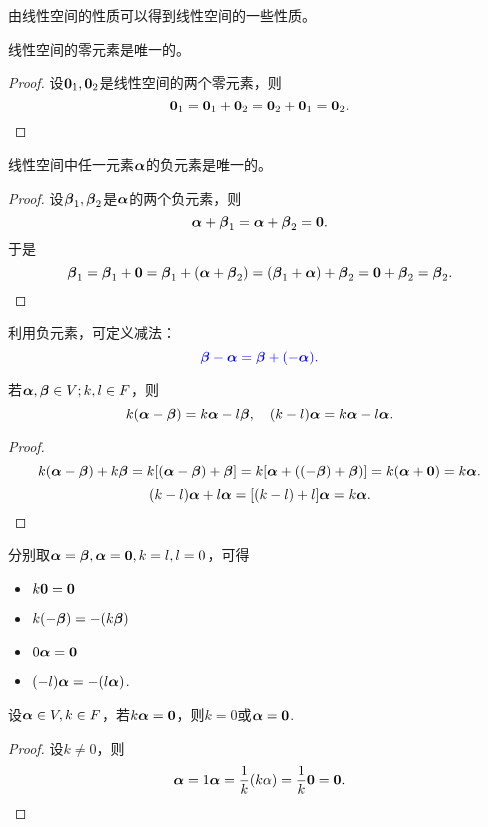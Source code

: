 \begin{frame}
由线性空间的性质可以得到线性空间的一些性质。\pause 

\begin{xingzhi}
  线性空间的零元素是唯一的。
\end{xingzhi} \pause 
\begin{proof}
  设$\M0_1, \M0_2$是线性空间的两个零元素，则
  $$
  \M0_1 = \M0_1+\M0_2 = \M0_2+\M0_1 = \M0_2.
  $$
\end{proof}
\end{frame}

\begin{frame}
\begin{xingzhi}
  线性空间中任一元素$\boldsymbol{\alpha}$的负元素是唯一的。
\end{xingzhi} \pause 
\begin{proof}
  设$\boldsymbol{\beta}_1, \boldsymbol{\beta}_2$是$\boldsymbol{\alpha}$的两个负元素，则
  $$
  \alphabd + \betabd_1 = \alphabd + \betabd_2 = \M0.
  $$
  于是
  $$
  \betabd_1 = \betabd_1 + \M0 = \betabd_1 + (\alphabd + \betabd_2)
  = (\betabd_1 + \alphabd) + \betabd_2 = \M0 + \betabd_2 = \betabd_2.
  $$
\end{proof} \pause 

利用负元素，可定义减法：
$$
\textcolor{blue}{\boldsymbol{\beta} - \boldsymbol{\alpha} = \boldsymbol{\beta} + (-\boldsymbol{\alpha}).}
$$
\end{frame}

\begin{frame}
  \begin{xingzhi}
    若$\boldsymbol{\alpha}, \boldsymbol{\beta} \in V; k, l \in F$，则
    $$
    k(\boldsymbol{\alpha} - \boldsymbol{\beta}) = k \boldsymbol{\alpha} - l \boldsymbol{\beta}, \quad
    (k-l)\boldsymbol{\alpha} = k\boldsymbol{\alpha} - l \boldsymbol{\alpha}.
    $$
  \end{xingzhi}\pause 
  \begin{proof}
    $$
    k(\alphabd - \betabd) + k \betabd = k[(\alphabd - \betabd) + \betabd]
    = k[\alphabd + ((- \betabd) + \betabd)] = k(\alphabd + \M0) = k \alphabd.
    $$
    $$
    (k-l)\boldsymbol{\alpha} + l\boldsymbol{\alpha} = [(k-l)+l]\boldsymbol{\alpha} = k\boldsymbol{\alpha}.
    $$
  \end{proof}\pause 

  分别取$\alphabd=\betabd, \alphabd = \M0, k = l, l = 0$，可得
  \begin{xingzhi}
    \begin{itemize}
      \item $k\M0 = \M0$
      \item $k(-\boldsymbol{\beta}) = -(k\boldsymbol{\beta})$
      \item $0\alphabd = \M0$
      \item $(-l)\boldsymbol{\alpha} = -(l\boldsymbol{\alpha})$.
    \end{itemize}
  \end{xingzhi}
\end{frame}

\begin{frame}
  \begin{xingzhi}
    设$\boldsymbol{\alpha} \in V, k\in F$，若$k\alphabd=\M0$，则$k=0$或$\alphabd=\M0$.
  \end{xingzhi}\pause
  \begin{proof}
    设$k\ne 0$，则
    $$\alphabd=1\alphabd=\frac1k(k\alpha)=\frac1k\M0=\M0.$$
  \end{proof}
\end{frame}